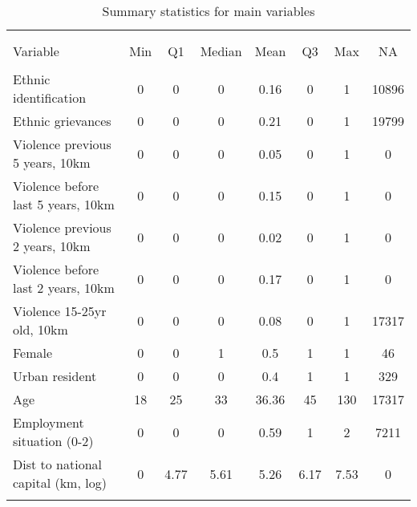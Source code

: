 \begin{table}[!htbp] \centering
\caption{Summary statistics for main variables}
\label{tab:sumstats}
\small
\begin{tabular}{lccccccc}
\\[-1.8ex]\hline
\hline \\[-1.8ex]
\\[-1.8ex]
Variable & Min & Q1 & Median & Mean & Q3 & Max & NA \\
\hline \\[-1.8ex]
Ethnic identification & 0 & 0 & 0 & 0.16 & 0 & 1 & 10896 \\
Ethnic grievances & 0 & 0 & 0 & 0.21 & 0 & 1 & 19799 \\
Violence previous 5 years, 10km & 0 & 0 & 0 & 0.05 & 0 & 1 & 0 \\
Violence before last 5 years, 10km & 0 & 0 & 0 & 0.15 & 0 & 1 & 0 \\
Violence previous 2 years, 10km & 0 & 0 & 0 & 0.02 & 0 & 1 & 0 \\
Violence before last 2 years, 10km & 0 & 0 & 0 & 0.17 & 0 & 1 & 0 \\
Violence 15-25yr old, 10km & 0 & 0 & 0 & 0.08 & 0 & 1 & 17317 \\
Female & 0 & 0 & 1 & 0.5 & 1 & 1 & 46 \\
Urban resident & 0 & 0 & 0 & 0.4 & 1 & 1 & 329 \\
Age & 18 & 25 & 33 & 36.36 & 45 & 130 & 17317 \\
Employment situation (0-2) & 0 & 0 & 0 & 0.59 & 1 & 2 & 7211 \\
Dist to national capital (km, log) & 0 & 4.77 & 5.61 & 5.26 & 6.17 & 7.53 & 0 \\
\hline
\hline \\[-1.8ex]
\end{tabular}
\end{table}

